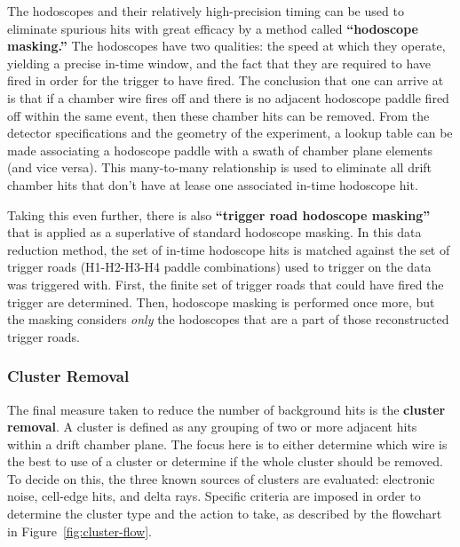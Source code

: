 The hodoscopes and their relatively high-precision timing can be used to eliminate spurious hits with great efficacy by a method called \textbf{``hodoscope masking.''} The hodoscopes have two qualities: the speed at which they operate, yielding a precise in-time window, and the fact that they are required to have fired in order for the trigger to have fired. The conclusion that one can arrive at is that if a chamber wire fires off and there is no adjacent hodoscope paddle fired off within the same event, then these chamber hits can be removed. From the detector specifications and the geometry of the experiment, a lookup table can be made associating a hodoscope paddle with a swath of chamber plane elements (and vice versa). This many-to-many relationship is used to eliminate all drift chamber hits that don't have at lease one associated in-time hodoscope hit.

Taking this even further, there is also \textbf{``trigger road hodoscope masking''} that is applied as a superlative of standard hodoscope masking. In this data reduction method, the set of in-time hodoscope hits is matched against the set of trigger roads (H1-H2-H3-H4 paddle combinations) used to trigger on the data was triggered with. First, the finite set of trigger roads that could have fired the trigger are determined. Then, hodoscope masking is performed once more, but the masking considers \emph{only} the hodoscopes that are a part of those reconstructed trigger roads.

\subsubsection{Cluster Removal}

The final measure taken to reduce the number of background hits is the \textbf{cluster removal}. A cluster is defined as any grouping of two or more adjacent hits within a drift chamber plane. The focus here is to either determine which wire is the best to use of a cluster or determine if the whole cluster should be removed. To decide on this, the three known sources of clusters are evaluated: electronic noise, cell-edge hits, and delta rays. Specific criteria are imposed in order to determine the cluster type and the action to take, as described by the flowchart in Figure~\ref{fig:cluster-flow}.

